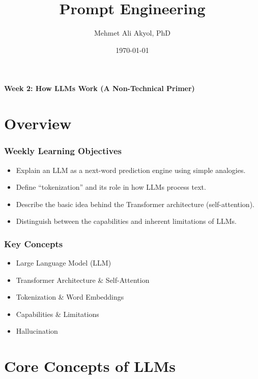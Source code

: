 \documentclass{beamer}
\title{Prompt Engineering}
\author{Mehmet Ali Akyol, PhD}
\institute{Ankara Medipol University}
\date{\today}
\begin{document}
\begin{frame}
    \titlepage
    \begin{center}
        \vspace{1cm}
        \textbf{Week 2: How LLMs Work (A Non-Technical Primer)}
    \end{center}
\end{frame}

\section{Overview}

\begin{frame}
    \frametitle{Weekly Learning Objectives}
    \begin{itemize}
        \item Explain an LLM as a next-word prediction engine using simple analogies.
    \item Define ``tokenization'' and its role in how LLMs process text.
        \item Describe the basic idea behind the Transformer architecture (self-attention).
        \item Distinguish between the capabilities and inherent limitations of LLMs.
    \end{itemize}
\end{frame}

\begin{frame}
    \frametitle{Key Concepts}
    \begin{itemize}
        \item Large Language Model (LLM)
        \item Transformer Architecture \& Self-Attention
        \item Tokenization \& Word Embeddings

        \item Capabilities \& Limitations
        \item Hallucination
    \end{itemize}
\end{frame}

\section{Core Concepts of LLMs}
\end{document}

